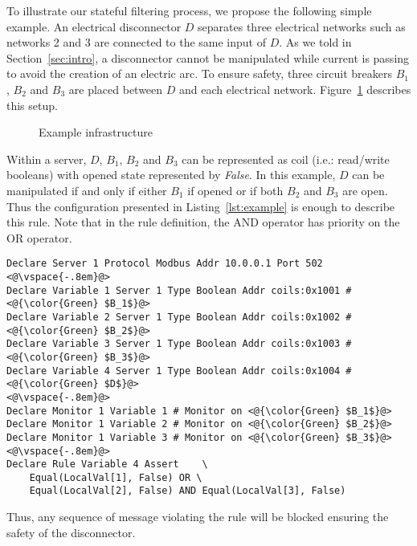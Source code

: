 To illustrate our stateful filtering process, we propose the following simple
example.
An electrical disconnector $D$ separates three electrical networks such as
networks 2 and 3 are connected to the same input of $D$.
As we told in Section~\ref{sec:intro}, a disconnector cannot be manipulated while
current is passing to avoid the creation of an electric arc.
To ensure safety, three circuit breakers $B_1$, $B_2$ and $B_3$ are placed
between $D$ and each electrical network.
Figure~\ref{fig:example} describes this setup.

\begin{figure}[htb]
    \centering
    \resizebox{.5\textwidth}{!}{
        
    }
    \caption{Example infrastructure}
    \label{fig:example}
\end{figure}

Within a \modbus server, $D$, $B_1$, $B_2$ and $B_3$ can be represented as coil
(i.e.: read/write booleans) with opened state represented by {\em False}.
In this example, $D$ can be manipulated if and only if either $B_1$ if opened
or if both $B_2$ and $B_3$ are open.
Thus the configuration presented in Listing~\ref{lst:example} is enough to
describe this rule.
Note that in the rule definition, the AND operator has priority on the OR
operator.

\begin{lstlisting}[label=lst:example,caption=Example configuration]
Declare Server 1 Protocol Modbus Addr 10.0.0.1 Port 502
<@\vspace{-.8em}@>
Declare Variable 1 Server 1 Type Boolean Addr coils:0x1001 # <@{\color{Green} $B_1$}@>
Declare Variable 2 Server 1 Type Boolean Addr coils:0x1002 # <@{\color{Green} $B_2$}@>
Declare Variable 3 Server 1 Type Boolean Addr coils:0x1003 # <@{\color{Green} $B_3$}@>
Declare Variable 4 Server 1 Type Boolean Addr coils:0x1004 # <@{\color{Green} $D$}@>
<@\vspace{-.8em}@>
Declare Monitor 1 Variable 1 # Monitor on <@{\color{Green} $B_1$}@>
Declare Monitor 1 Variable 2 # Monitor on <@{\color{Green} $B_2$}@>
Declare Monitor 1 Variable 3 # Monitor on <@{\color{Green} $B_3$}@>
<@\vspace{-.8em}@>
Declare Rule Variable 4 Assert    \
    Equal(LocalVal[1], False) OR \
    Equal(LocalVal[2], False) AND Equal(LocalVal[3], False)
\end{lstlisting}

Thus, any sequence of message violating the rule will be blocked ensuring the
safety of the disconnector.
